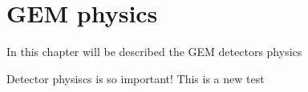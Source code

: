 \documentclass[]{book}
\begin{document}
\chapter{GEM physics}

In this chapter will be described the GEM detectors physics

Detector physiscs is so important! This is a new test 

\end{document}

